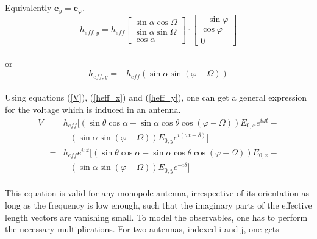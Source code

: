 \documentclass[a4paper,10pt]{thesis}
\begin{document}
\paragraph*{}
Equivalently $\textbf{e}_y=\textbf{e}_\varphi$.
\begin{equation}
{h}_{eff,y} = h_{eff} \left[ \begin{array}{c}
\sin \alpha \cos \Omega\\
\sin \alpha \sin \Omega\\
\cos \alpha
\end{array}  \right] \cdot \left[ \begin{array}{c}
-\sin \varphi\\
\cos \varphi\\
0
\end{array}  \right]
\end{equation}
\paragraph*{}
or
\begin{equation}
{h}_{eff,y} = -h_{eff}( \sin \alpha \sin (\varphi - \Omega ) )\label{heff_y}
\end{equation}

\paragraph*{}
Using equations (\ref{V}), (\ref{heff_x}) and (\ref{heff_y}), one can get a general expression for the voltage which is induced in an antenna.
\begin{eqnarray}
V & = & h_{eff} [ (\sin \theta \cos \alpha - \sin \alpha \cos \theta \cos (\varphi - \Omega) )E_{0,x}e^{i \omega t} - \nonumber \\
& & -(\sin \alpha \sin (\varphi - \Omega))E_{0,y}e^{i (\omega t-\delta) } ] \nonumber \\
& = & h_{eff} e^{i \omega t} [ (\sin \theta \cos \alpha - \sin \alpha \cos \theta \cos (\varphi - \Omega) )E_{0,x} - \\
& & -(\sin \alpha \sin (\varphi - \Omega))E_{0,y}e^{-i \delta } ] \nonumber
\end{eqnarray}

\paragraph*{}
This equation is valid for any monopole antenna, irrespective of its orientation as long as the frequency is low enough, such that the imaginary parts of the effective length vectors are vanishing small. To model the observables, one has to perform the necessary multiplications. For two antennas, indexed i and j, one gets
\end{document}
